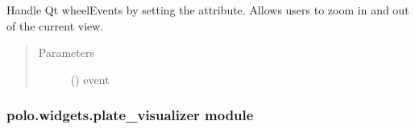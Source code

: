 \documentclass[letterpaper,10pt,english]{sphinxmanual}
\begin{document}
\begin{fulllineitems}
\begin{fulllineitems}
\end{fulllineitems}


\begin{fulllineitems}
\label{\detokenize{polo.widgets:polo.widgets.plate_viewer.plateViewer.wheelEvent}}
Handle Qt wheelEvents by setting the  attribute. Allows users
to zoom in and out of the current view.
\begin{quote}\begin{description}
\item[{Parameters}] \leavevmode
{} () \textendash{} event

\end{description}\end{quote}

\end{fulllineitems}


\end{fulllineitems}



\subsubsection{polo.widgets.plate\_visualizer module}
\label{\detokenize{polo.widgets:module-polo.widgets.plate_visualizer}}\label{\detokenize{polo.widgets:polo-widgets-plate-visualizer-module}}
\end{document}
